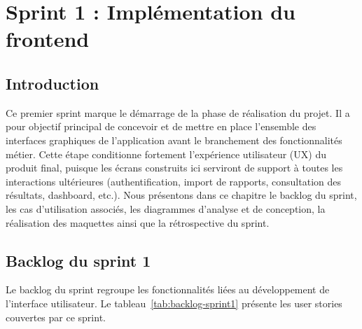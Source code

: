 

\chapter{Sprint 1 : Implémentation du frontend}

\section*{Introduction}
Ce premier sprint marque le démarrage de la phase de réalisation du projet. Il a pour
objectif principal de concevoir et de mettre en place l'ensemble des interfaces
graphiques de l'application avant le branchement des fonctionnalités métier. Cette
étape conditionne fortement l'expérience utilisateur (UX) du produit final, puisque
les écrans construits ici serviront de support à toutes les interactions ultérieures
(authentification, import de rapports, consultation des résultats, dashboard, etc.).
Nous présentons dans ce chapitre le backlog du sprint, les cas d'utilisation associés,
les diagrammes d'analyse et de conception, la réalisation des maquettes ainsi que la
rétrospective du sprint.

\section{Backlog du sprint 1}
Le backlog du sprint regroupe les fonctionnalités liées au développement de l'interface
utilisateur. Le tableau~\ref{tab:backlog-sprint1} présente les user stories couvertes
par ce sprint.

